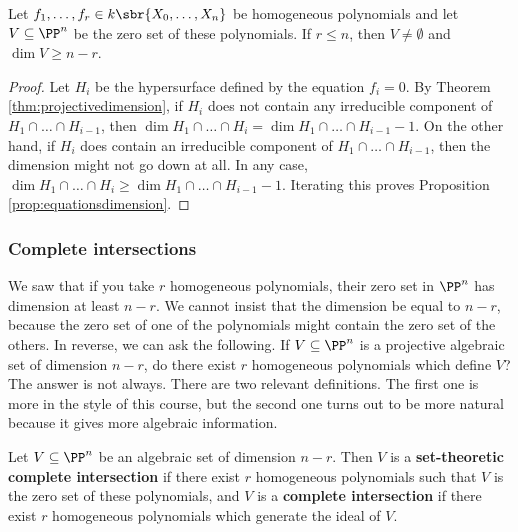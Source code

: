 \pagebreak

\begin{proposition}
\label{prop:equationsdimension}
Let $ f_1, \dots, f_r \in k\sbr{X_0, \dots, X_n} $ be homogeneous polynomials and let $ V \subseteq \PP^n $ be the zero set of these polynomials. If $ r \le n $, then $ V \ne \emptyset $ and $ \dim V \ge n - r $.
\end{proposition}

\begin{proof}
Let $ H_i $ be the hypersurface defined by the equation $ f_i = 0 $. By Theorem \ref{thm:projectivedimension}, if $ H_i $ does not contain any irreducible component of $ H_1 \cap \dots \cap H_{i - 1} $, then $ \dim H_1 \cap \dots \cap H_i = \dim H_1 \cap \dots \cap H_{i - 1} - 1 $. On the other hand, if $ H_i $ does contain an irreducible component of $ H_1 \cap \dots \cap H_{i - 1} $, then the dimension might not go down at all. In any case, $ \dim H_1 \cap \dots \cap H_i \ge \dim H_1 \cap \dots \cap H_{i - 1} - 1 $. Iterating this proves Proposition \ref{prop:equationsdimension}.
\end{proof}

\subsubsection{Complete intersections}

We saw that if you take $ r $ homogeneous polynomials, their zero set in $ \PP^n $ has dimension at least $ n - r $. We cannot insist that the dimension be equal to $ n - r $, because the zero set of one of the polynomials might contain the zero set of the others. In reverse, we can ask the following. If $ V \subseteq \PP^n $ is a projective algebraic set of dimension $ n - r $, do there exist $ r $ homogeneous polynomials which define $ V $? The answer is not always. There are two relevant definitions. The first one is more in the style of this course, but the second one turns out to be more natural because it gives more algebraic information.

\begin{definition*}
Let $ V \subseteq \PP^n $ be an algebraic set of dimension $ n - r $. Then $ V $ is a \textbf{set-theoretic complete intersection} if there exist $ r $ homogeneous polynomials such that $ V $ is the zero set of these polynomials, and $ V $ is a \textbf{complete intersection} if there exist $ r $ homogeneous polynomials which generate the ideal of $ V $.
\end{definition*}

